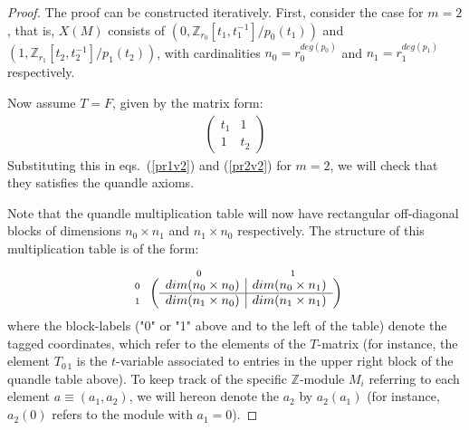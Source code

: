 \documentclass[a4paper,12pt]{article}
\newcommand{\Z}{\mathbb{Z}}
\begin{document}
\begin{proof}
The proof can be constructed iteratively. First, consider the case for  $m = 2$, that is, $X(M)$ consists of $(0, \Z_{r_0} [t_{1}, t_{1}^{-1}]/p_0 (t_{1}))$  and  $(1, \Z_{r_1} [t_{2}, t_{2}^{-1}]/p_1 (t_{2}))$, with cardinalities $n_0 = r_0^{deg (p_0)}$ and $n_1 = r_1^{deg (p_1)}$ respectively.   

Now assume $T = F$, given by the matrix form:
\begin{eqnarray}  
\begin{pmatrix} t_1 & 1 \\ 1 & t_2 \end{pmatrix}  
\label{teq10}
\end{eqnarray}
Substituting this in eqs.~(\ref{pr1v2}) and (\ref{pr2v2}) for $m = 2$, we will  check that they satisfies the quandle axioms. 

Note that the quandle multiplication table will now have rectangular off-diagonal blocks of dimensions $n_0 \times n_1$ and $n_1 \times n_0$ respectively. The structure of this multiplication table is of the form:
\begin{eqnarray}
\begin{array}{r@{\mskip\thickmuskip}c}
& \begin{array}{c@{\hspace{7.0em}}c} \scriptstyle 0 & \scriptstyle 1 \end{array} \\[-0.5ex]
\begin{array}{r} \scriptstyle 0 \\ \scriptstyle 1 \end{array} & 
 \left(\begin{array}{c|c}
dim (n_0 \times n_0) & dim (n_0 \times n_1) \\ \hline
dim (n_1 \times n_0) & dim (n_1 \times n_1)
\end{array}\right) 
\end{array}
\label{tab1}
\end{eqnarray}
where the block-labels ("0" or "1" above and to the left of the table) denote the tagged coordinates, which refer to the elements of the $T$-matrix (for instance, the element $T_{0\,1}$ is the $t$-variable associated to entries in the upper right block of the quandle table above).  To keep track of the specific $\Z$-module $M_i$  referring to each element $a \equiv (a_1, a_2)$, we will hereon denote the $a_2$ by $a_2 (a_1)$ (for instance, $a_2 (0)$ refers to the module with $a_1 = 0$). 


\end{proof}
\end{document}
